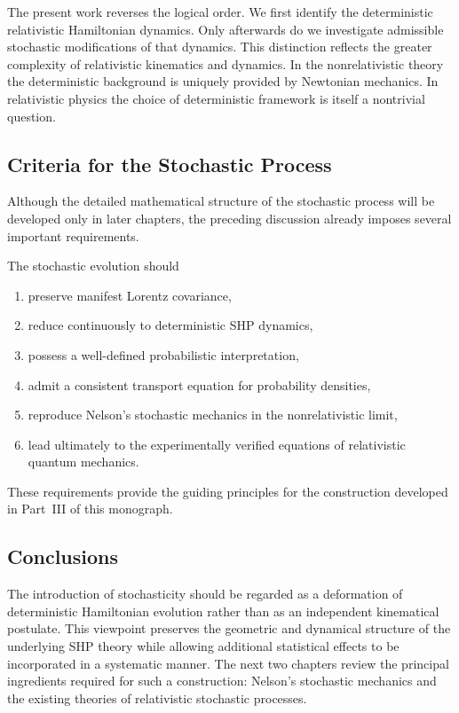 The present work reverses the logical order.
We first identify the deterministic relativistic Hamiltonian dynamics.
Only afterwards do we investigate admissible stochastic modifications of
that dynamics.
This distinction reflects the greater complexity of relativistic
kinematics and dynamics.
In the nonrelativistic theory the deterministic background is uniquely
provided by Newtonian mechanics.
In relativistic physics the choice of deterministic framework is itself
a nontrivial question.
\subsection{Criteria for the Stochastic Process}
Although the detailed mathematical structure of the stochastic process
will be developed only in later chapters, the preceding discussion
already imposes several important requirements.

The stochastic evolution should
\begin{enumerate}
\item preserve manifest Lorentz covariance,
\item reduce continuously to deterministic SHP dynamics,
\item possess a well-defined probabilistic interpretation,
\item admit a consistent transport equation for probability densities,
\item reproduce Nelson's stochastic mechanics in the
nonrelativistic limit,
\item lead ultimately to the experimentally verified equations of
relativistic quantum mechanics.
\end{enumerate}
These requirements provide the guiding principles for the construction
developed in Part~III of this monograph.
\subsection{Conclusions}
The introduction of stochasticity should be regarded as a deformation of
deterministic Hamiltonian evolution rather than as an independent
kinematical postulate.
This viewpoint preserves the geometric and dynamical structure of the
underlying SHP theory while allowing additional statistical effects to
be incorporated in a systematic manner.
The next two chapters review the principal ingredients required for such
a construction: Nelson's stochastic mechanics and the existing theories
of relativistic stochastic processes.
